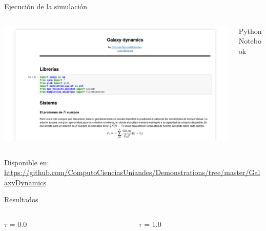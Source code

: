 \documentclass{beamer}
\begin{document}
\begin{frame}{Ejecuci\'on de la simulaci\'on}
	\begin{columns}
		\begin{column}{0.75\textwidth}
			\includegraphics[height=0.5\textheight]{sources/images/screen.png}
		\end{column}
		\begin{column}{0.25\textwidth}
			Python Notebook
		\end{column}
	\end{columns}
	Disponible en:
	\tiny
	\url{https://github.com/ComputoCienciasUniandes/Demonstrations/tree/master/GalaxyDynamics}
	\normalsize
\end{frame}
\begin{frame}{Resultados}
	\begin{columns}
		\begin{column}{0.5\textwidth}
			$\tau$ = 0.0
		\end{column}
		\begin{column}{0.5\textwidth}
			$\tau$ = 1.0
		\end{column}
	\end{columns}
\end{frame}
\end{document}
